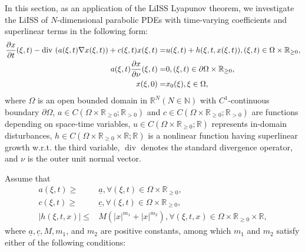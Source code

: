 \documentclass[onecolumn]{autart}
\newenvironment{proof of Prop.ODE}{{\it Proof of Proposition~\ref{Prop.ODE}:\enspace}}{\hfill $\blacksquare$\par}
\newenvironment{proof of PDE}{{\it Proof of Proposition \ref{Prop.8}:\enspace}}{\hfill $\blacksquare$\par}
\begin{document}
{In this section, as an application of the LiISS Lyapunov theorem, we  investigate  the LiISS of   $N$-dimensional parabolic PDEs with time-varying coefficients and superlinear terms in the following form:
\begin{subequations}\label{4.4}
	\begin{align}
		\frac{\partial x}{\partial t}(\xi,t)-{\rm div}\ (a(\xi,t)\nabla x(\xi,t))+c(\xi,t)x(\xi,t)= & u(\xi,t)+h(\xi,t,x(\xi,t)),(\xi,t)\in \Omega\times\mathbb{R}_{\geq 0},\label{3.1a}\\
		a(\xi,t)\frac{\partial x }{\partial \nu} (\xi,t)= & 0,(\xi,t)\in\partial \Omega\times \mathbb{R}_{\geq 0},\\
		x(\xi,0)= & x_0(\xi),\xi\in\Omega,
	\end{align}
\end{subequations}
where $\Omega $ is an open bounded domain in $\mathbb{R}^N  (N\in\mathbb{N}) $ with $C^1$-continuous boundary $\partial \Omega$,    $a\in C (\Omega\times\mathbb{R}_{\geq 0};\mathbb{R}_{>0})$ and $c\in C(\Omega\times\mathbb{R}_{\geq 0};\mathbb{R}_{>0})$ are  functions depending on space-time variables,    $u\in C (\Omega\times\mathbb{R}_{\geq 0};\mathbb{R})$ represents in-domain disturbances, $h\in C(\Omega\times\mathbb{R}_{\geq 0}\times\mathbb{R};\mathbb{R})$ is a nonlinear function having superlinear growth w.r.t. the third variable,    $\operatorname{div}$ denotes the standard divergence operator, and $\nu$ is the outer unit normal vector.


Assume that
\begin{align*}
	a(\xi, t)\geq &\underline{a}   ,\forall (\xi, t)\in{\Omega}\times\mathbb{R}_{\geq 0}, \\
	c(\xi, t)\geq &   \underline{c}  , \forall (\xi, t)\in{\Omega}\times\mathbb{R}_{\geq 0}, \\
	\left|h(\xi, t, x)\right|\leq & M( \left|x\right|^{m_1}+  \left|x\right|^{m_2}), \forall (\xi, t,x)\in{\Omega}\times\mathbb{R}_{\geq 0}\times \mathbb{R},
\end{align*}
where  $\underline{a} ,\underline{c},M,m_1$, {and $m_2$} are positive constants, among which $m_1$ and $m_2$  satisfy either of the following  conditions:

}
\end{document}
